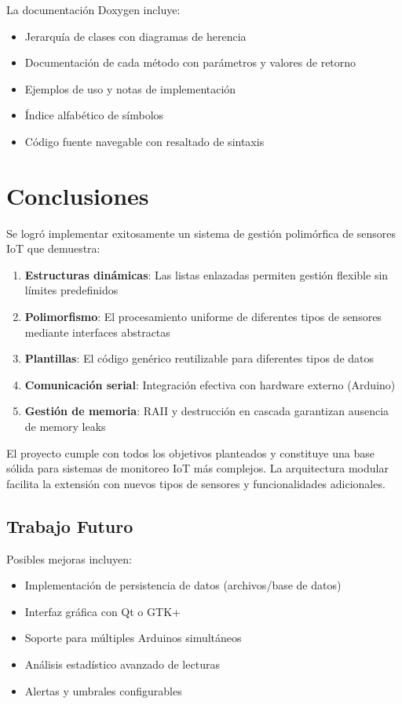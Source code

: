 \documentclass[conference]{IEEEtran}
\begin{document}
La documentación Doxygen incluye:

\begin{itemize}
    \item Jerarquía de clases con diagramas de herencia
    \item Documentación de cada método con parámetros y valores de retorno
    \item Ejemplos de uso y notas de implementación
    \item Índice alfabético de símbolos
    \item Código fuente navegable con resaltado de sintaxis
\end{itemize}

\section{Conclusiones}

Se logró implementar exitosamente un sistema de gestión polimórfica de sensores IoT que demuestra:

\begin{enumerate}
    \item \textbf{Estructuras dinámicas}: Las listas enlazadas permiten gestión flexible sin límites predefinidos
    \item \textbf{Polimorfismo}: El procesamiento uniforme de diferentes tipos de sensores mediante interfaces abstractas
    \item \textbf{Plantillas}: El código genérico reutilizable para diferentes tipos de datos
    \item \textbf{Comunicación serial}: Integración efectiva con hardware externo (Arduino)
    \item \textbf{Gestión de memoria}: RAII y destrucción en cascada garantizan ausencia de memory leaks
\end{enumerate}

El proyecto cumple con todos los objetivos planteados y constituye una base sólida para sistemas de monitoreo IoT más complejos. La arquitectura modular facilita la extensión con nuevos tipos de sensores y funcionalidades adicionales.

\subsection{Trabajo Futuro}

Posibles mejoras incluyen:
\begin{itemize}
    \item Implementación de persistencia de datos (archivos/base de datos)
    \item Interfaz gráfica con Qt o GTK+
    \item Soporte para múltiples Arduinos simultáneos
    \item Análisis estadístico avanzado de lecturas
    \item Alertas y umbrales configurables
\end{itemize}
\end{document}
